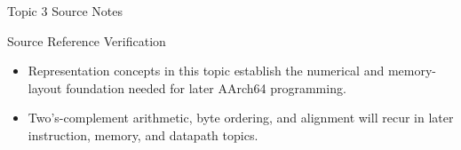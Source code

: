 \documentclass[aspectratio=169,11pt,t]{beamer}
\begin{document}





\begin{frame}{Topic 3 Source Notes}
\begin{block}{Source Reference Verification}
\begin{itemize}
\item Representation concepts in this topic establish the numerical and memory-layout foundation needed for later AArch64 programming.
\item Two's-complement arithmetic, byte ordering, and alignment will recur in later instruction, memory, and datapath topics.
\end{itemize}
\end{block}
\end{frame}
\end{document}
